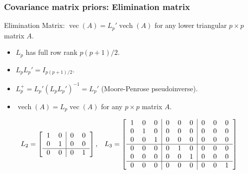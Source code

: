 \documentclass[xcolor=dvipsnames]{beamer}
\DeclareMathOperator{\vech}{vech}
\DeclareMathOperator{\vect}{vec}
\begin{document}
\begin{frame}
\frametitle{Covariance matrix priors: Elimination matrix}
Elimination Matrix: $\vect(A)=L_p'\vech(A)$ for any lower triangular $p\times p$ matrix $A$.
\begin{itemize}
\item $L_p$ has full row rank $p(p+1)/2$.
\item $L_pL_p'=I_{p(p+1)/2}$.
\item $L_p^{+}=L_p'(L_pL_p')^{-1}=L_p'$ (Moore-Penrose pseudoinverse).
\item $\vech(A)=L_p\vect(A)$ for any $p\times p$ matrix $A$.
\end{itemize}
\pause\begin{align*}
L_2 = \left[\begin{tabular}{cc|cc} 1 & 0 & 0 & 0 \\ 0 & 1 & 0 & 0 \\\hline 0 & 0 & 0 & 1 \end{tabular}\right], && L_3 =  \left[\begin{tabular}{ccc|ccc|ccc}
1 & 0 & 0 & 0 & 0 & 0 & 0 & 0 & 0  \\ 
0 & 1 & 0 & 0 & 0 & 0 & 0 & 0 & 0 \\ 
0 & 0 & 1 & 0 & 0 & 0 & 0 & 0 & 0 \\\hline
0 & 0 & 0 & 0 & 1 & 0 & 0 & 0 & 0 \\
0 & 0 & 0 & 0 & 0 & 1 & 0 & 0 & 0 \\\hline
0 & 0 & 0 & 0 & 0 & 0 & 0 & 0 & 1 \\
\end{tabular}\right]\\~\\
\end{align*}
\end{frame}
\end{document}
